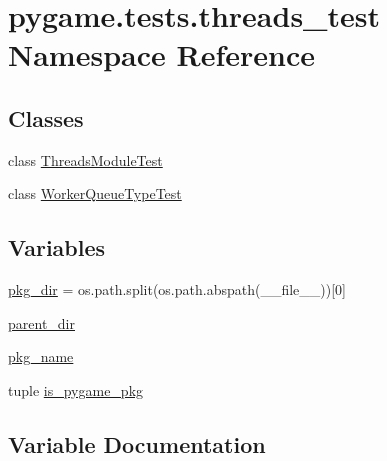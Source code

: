 \hypertarget{namespacepygame_1_1tests_1_1threads__test}{}\section{pygame.\+tests.\+threads\+\_\+test Namespace Reference}
\label{namespacepygame_1_1tests_1_1threads__test}
\subsection*{Classes}
\begin{DoxyCompactItemize}
\item 
class \hyperlink{classpygame_1_1tests_1_1threads__test_1_1_threads_module_test}{Threads\+Module\+Test}
\item 
class \hyperlink{classpygame_1_1tests_1_1threads__test_1_1_worker_queue_type_test}{Worker\+Queue\+Type\+Test}
\end{DoxyCompactItemize}
\subsection*{Variables}
\begin{DoxyCompactItemize}
\item 
\hyperlink{namespacepygame_1_1tests_1_1threads__test_a691da33c305af84eae0637e6fe5d7ab1}{pkg\+\_\+dir} = os.\+path.\+split(os.\+path.\+abspath(\+\_\+\+\_\+file\+\_\+\+\_\+))\mbox{[}0\mbox{]}
\item 
\hyperlink{namespacepygame_1_1tests_1_1threads__test_aa7f9e27febcb96e835087d4a6839391c}{parent\+\_\+dir}
\item 
\hyperlink{namespacepygame_1_1tests_1_1threads__test_a58fda3062d5273346f9f9376c9c5804c}{pkg\+\_\+name}
\item 
tuple \hyperlink{namespacepygame_1_1tests_1_1threads__test_ae58c694c5db785f83c2a895e275e6554}{is\+\_\+pygame\+\_\+pkg}
\end{DoxyCompactItemize}


\subsection{Variable Documentation}
\mbox{\label{namespacepygame_1_1tests_1_1threads__test_ae58c694c5db785f83c2a895e275e6554}} 
